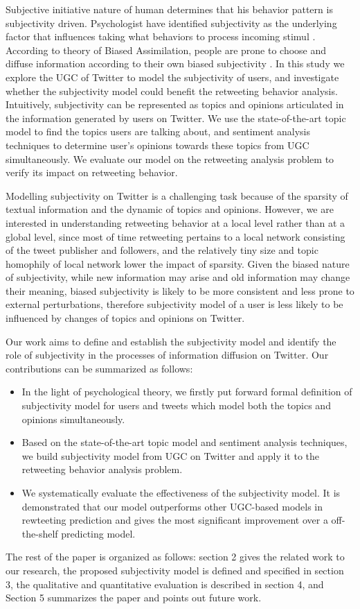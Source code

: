\documentclass[twocolumn]{svjour3}          %
\begin{document}
Subjective initiative nature of human determines that his behavior pattern is subjectivity driven.
Psychologist have identified subjectivity as the underlying factor that influences taking what behaviors to process incoming stimul \cite{Moore2008}.
According to theory of Biased Assimilation, people are prone to choose and diffuse information according to their own biased subjectivity \cite{Hyman2000,sunstein2009rumors}. 
In this study we explore the UGC of Twitter to model the subjectivity of users, and investigate whether the subjectivity model could benefit the retweeting behavior analysis. 
Intuitively, subjectivity can be represented as topics and opinions articulated in the information generated by users on Twitter.
We use the state-of-the-art topic model to find the topics users are talking about, and sentiment analysis techniques to determine user's opinions towards these topics from UGC simultaneously. 
We evaluate our model on the retweeting analysis problem to verify its impact on retweeting behavior.

Modelling subjectivity on Twitter is a challenging task because of the sparsity of textual information and the dynamic of topics and opinions.
However, we are interested in understanding retweeting behavior at a local level rather than at a global level, since most of time retweeting pertains to a local network consisting of the tweet publisher and followers, and the relatively tiny size and topic homophily of local network lower the impact of sparsity.
Given the biased nature of subjectivity, while new information may arise and old information may change their meaning, biased subjectivity is likely to be more consistent and less prone to external perturbations, therefore subjectivity model  of a user is less likely to be influenced by changes of topics and opinions on Twitter.
 
Our work aims to define and establish the subjectivity model  and identify the role of subjectivity in the processes of information diffusion on Twitter. Our contributions can be summarized as follows:
\begin{itemize}
\item In the light of psychological theory, we firstly put forward formal definition of subjectivity model  for users and tweets which model both the topics and opinions simultaneously.
\item Based on the state-of-the-art topic model and sentiment analysis techniques, we build subjectivity model from UGC on Twitter and apply it to the retweeting behavior analysis problem. 
\item We systematically evaluate the effectiveness of the subjectivity model. It is demonstrated that our model outperforms other UGC-based models in rewteeting prediction and gives the most significant improvement over a off-the-shelf predicting model. 
\end{itemize}
The rest of the paper is organized as follows: section 2 gives the related work to our research, the proposed subjectivity model  is defined and specified in section 3, the qualitative and quantitative evaluation is described in section 4, and Section 5 summarizes the paper and points out future work.
\end{document}
